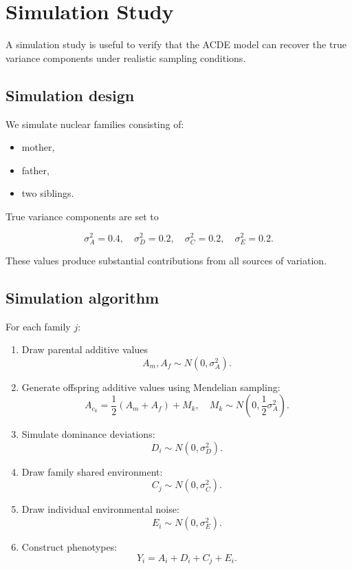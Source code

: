\documentclass[11pt]{article}
\begin{document}
\section{Simulation Study}

A simulation study is useful to verify that the ACDE model can recover the 
true variance components under realistic sampling conditions.

\subsection{Simulation design}

We simulate nuclear families consisting of:
\begin{itemize}
\item mother,
\item father,
\item two siblings.
\end{itemize}

True variance components are set to

\[
\sigma_A^2 = 0.4,\quad
\sigma_D^2 = 0.2,\quad
\sigma_C^2 = 0.2,\quad
\sigma_E^2 = 0.2.
\]

These values produce substantial contributions from all sources of variation.

\subsection{Simulation algorithm}

For each family $j$:

\begin{enumerate}
\item Draw parental additive values
\[
A_m, A_f \sim N(0,\sigma_A^2).
\]

\item Generate offspring additive values using Mendelian sampling:
\[
A_{c_k} = \frac{1}{2}(A_m + A_f) + M_k,
\quad M_k \sim N\!\left(0,\frac{1}{2}\sigma_A^2\right).
\]

\item Simulate dominance deviations:
\[
D_i \sim N(0,\sigma_D^2).
\]

\item Draw family shared environment:
\[
C_j \sim N(0,\sigma_C^2).
\]

\item Draw individual environmental noise:
\[
E_i \sim N(0,\sigma_E^2).
\]

\item Construct phenotypes:
\[
Y_i = A_i + D_i + C_j + E_i.
\]
\end{enumerate}
\end{document}
